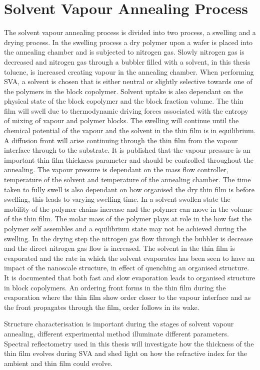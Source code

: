 \documentclass[MasterThesisMain.tex]{subfiles}
\begin{document}
\section{Solvent Vapour Annealing Process}
The solvent vapour annealing process is divided into two process, a swelling and a drying process. In the swelling process a dry polymer upon a wafer is placed into the annealing chamber and is subjected to nitrogen gas. Slowly nitrogen gas is decreased and nitrogen gas through a bubbler filled with a solvent, in this thesis toluene, is increased creating vapour in the annealing chamber. When performing SVA, a solvent is chosen that is either neutral or slightly selective towards one of the polymers in the block copolymer. Solvent uptake is also dependant on the physical state of the block copolymer and the block fraction volume. The thin film will swell due to thermodynamic driving forces associated with the entropy of mixing of vapour and polymer blocks. The swelling will continue until the chemical potential of the vapour and the solvent in the thin film is in equilibrium. A diffusion front will arise continuing through the thin film from the vapour interface through to the substrate. It is published that the vapour pressure is an important thin film thickness parameter and should be controlled throughout the annealing. The vapour pressure is dependant on the mass flow controller, temperature of the solvent and temperature of the annealing chamber. The time taken to fully swell is also dependant on how organised the dry thin film is before swelling, this leads to varying swelling time. In a solvent swollen state the mobility of the polymer chains increase and the polymer can move in the volume of the thin film. The molar mass of the polymer plays at role in the how fast the polymer self assembles and a equilibrium state may not be achieved during the swelling. In the drying step the nitrogen gas flow through the bubbler is decrease and the direct nitrogen gas flow is increased. The solvent in the thin film is evaporated and the rate in which the solvent evaporates has been seen to have an impact of the nanoscale structure, in effect of quenching an organised structure. It is documented that both fast and slow evaporation leads to organised structure in block copolymers. An ordering front forms in the thin film during the evaporation where the thin film show order closer to the vapour interface and as the front propagates through the film, order follows in its wake\cite{SVABCP}. 

Structure characterisation is important during the stages of solvent vapour annealing, different experimental method illuminate different parameters. Spectral reflectometry used in this thesis will investigate how the thickness of the thin film evolves during SVA and shed light on how the refractive index for the ambient and thin film could evolve. 
\end{document}
